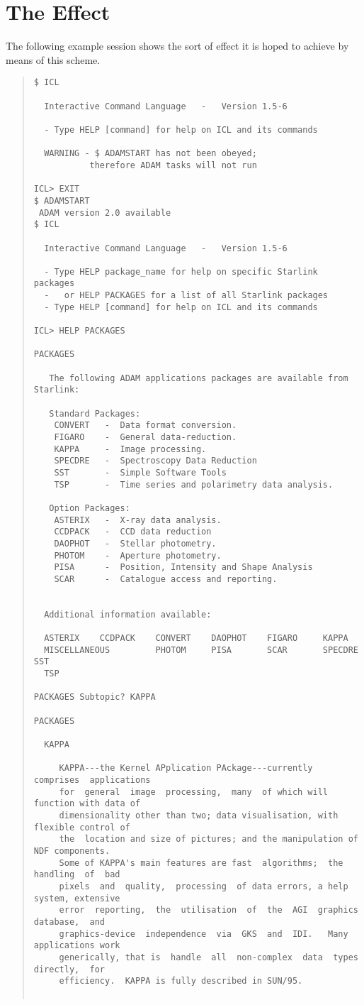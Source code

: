 \section{The Effect}
\label{effect}
The following example session shows the sort of effect it is hoped to achieve
by means of this scheme.
\small
\begin{quote}
\begin{verbatim}
$ ICL

  Interactive Command Language   -   Version 1.5-6

  - Type HELP [command] for help on ICL and its commands

  WARNING - $ ADAMSTART has not been obeyed;
           therefore ADAM tasks will not run

ICL> EXIT
$ ADAMSTART
 ADAM version 2.0 available
$ ICL

  Interactive Command Language   -   Version 1.5-6

  - Type HELP package_name for help on specific Starlink packages
  -   or HELP PACKAGES for a list of all Starlink packages
  - Type HELP [command] for help on ICL and its commands

ICL> HELP PACKAGES 
  
PACKAGES 
  
   The following ADAM applications packages are available from Starlink: 
  
   Standard Packages: 
    CONVERT   -  Data format conversion. 
    FIGARO    -  General data-reduction. 
    KAPPA     -  Image processing. 
    SPECDRE   -  Spectroscopy Data Reduction 
    SST       -  Simple Software Tools 
    TSP       -  Time series and polarimetry data analysis. 
  
   Option Packages: 
    ASTERIX   -  X-ray data analysis. 
    CCDPACK   -  CCD data reduction 
    DAOPHOT   -  Stellar photometry. 
    PHOTOM    -  Aperture photometry. 
    PISA      -  Position, Intensity and Shape Analysis 
    SCAR      -  Catalogue access and reporting. 
  
  
  Additional information available: 
  
  ASTERIX    CCDPACK    CONVERT    DAOPHOT    FIGARO     KAPPA 
  MISCELLANEOUS         PHOTOM     PISA       SCAR       SPECDRE    SST 
  TSP 
  
PACKAGES Subtopic? KAPPA 
  
PACKAGES 
  
  KAPPA 
  
     KAPPA---the Kernel APplication PAckage---currently  comprises  applications 
     for  general  image  processing,  many  of which will function with data of 
     dimensionality other than two; data visualisation, with flexible control of 
     the  location and size of pictures; and the manipulation of NDF components. 
     Some of KAPPA's main features are fast  algorithms;  the  handling  of  bad 
     pixels  and  quality,  processing  of data errors, a help system, extensive 
     error  reporting,  the  utilisation  of  the  AGI  graphics  database,  and 
     graphics-device  independence  via  GKS  and  IDI.   Many applications work 
     generically, that is  handle  all  non-complex  data  types  directly,  for 
     efficiency.  KAPPA is fully described in SUN/95. 
  

\end{verbatim}
\end{quote}
